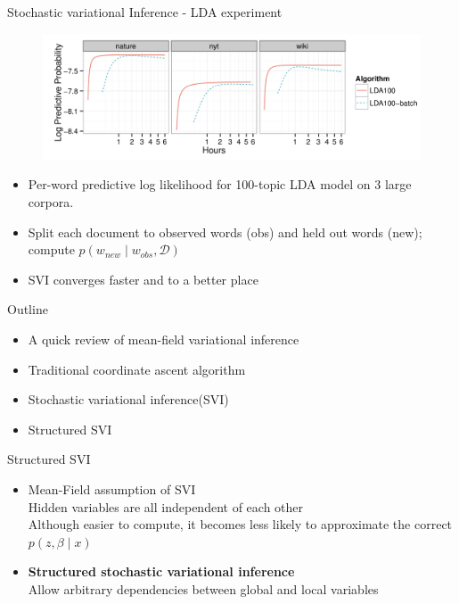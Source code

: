 \documentclass[aspectratio=169]{beamer}
\newenvironment{greytext}{\color{gray}}{\ignorespacesafterend}
\begin{document}
\begin{frame}{Stochastic variational Inference - LDA experiment}
    \begin{figure}
        \includegraphics[width=\textwidth]{LDA_SVI.png}
    \end{figure}
    \begin{itemize}
        \item Per-word predictive log likelihood for 100-topic LDA model on 3 large corpora.
        \item Split each document to observed words (obs) and held out words (new); compute $p(w_{new} \mid w_{obs}, \mathcal{D})$
        \item SVI converges faster and to a better place
    \end{itemize}
\end{frame}

\begin{frame}{Outline}

    \begin{itemize}
    \begin{greytext}
      \item A quick review of mean-field variational inference
      \item Traditional coordinate ascent algorithm
      \item Stochastic variational inference(SVI)
    \end{greytext}
      \item Structured SVI
    \end{itemize}
\end{frame}


\begin{frame}{Structured SVI}
    \begin{itemize}
        \item Mean-Field assumption of SVI\\
        Hidden variables are all independent of each other\\
        Although easier to compute, it becomes less likely to approximate the correct $p(z, \beta \mid x)$
        \item\textbf{ Structured stochastic variational inference}\\
        Allow arbitrary dependencies between global and local variables
    \end{itemize}
\end{frame}
\end{document}
